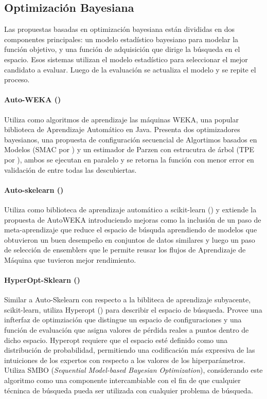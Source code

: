 \subsection{Optimizaci\'on Bayesiana}
Las propuestas basadas en optimizaci\'on bayesiana est\'an divididas en dos componentes principales: un modelo estad\'istico bayesiano para modelar la funci\'on objetivo, y una funci\'on de adquisici\'on que dirige la b\'usqueda en el espacio. Esos sistemas utilizan el modelo estad\'istico para seleccionar el mejor candidato a evaluar. Luego de la evaluaci\'on se actualiza el modelo y se repite el proceso.

\paragraph{Auto-WEKA (\cite{thornton2013auto})} Utiliza como algoritmos de aprendizaje las m\'aquinas WEKA, una popular biblioteca de Aprendizaje Autom\'atico en Java. Presenta dos optimizadores bayesianos, una propuesta de configuraci\'on secuencial de Algortimos basados en Modelos (SMAC por \cite{hutter2011sequential}) y un estimador de Parzen con estrucutra de \'arbol (TPE por \cite{bergstra2011algorithms}), ambos se ejecutan en paralelo y se retorna la funci\'on con menor error en validaci\'on de entre todas las descubiertas.

\paragraph*{Auto-skelearn (\cite{feurer2015efficient})} Utiliza como biblioteca de aprendizaje autom\'atico a scikit-learn (\cite{pedregosa2011scikit}) y extiende la propuesta de AutoWEKA  introduciendo mejoras como la inclusi\'on de un paso de meta-aprendizaje que reduce el espacio de b\'usquda aprendiendo de modelos que obtuvieron un buen desempe\~no en conjuntos de datos similares y luego un paso de selecci\'on de ensemblers que le permite reusar los flujos de Aprendizaje de M\'aquina que tuvieron mejor rendimiento. 

\paragraph*{HyperOpt-Sklearn (\cite{komer2014hyperopt})} Similar a Auto-Skelearn con respecto a la bibliteca de aprendizaje subyacente, scikit-learn, utiliza Hyperopt (\cite{bergstra2013hyperopt}) para describir el espacio de b\'usqueda. Provee una infterfaz de optimziaci\'on que distingue un espacio de configuraciones y una funci\'on de evaluaci\'on que asigna valores de p\'erdida reales a puntos dentro de dicho espacio. Hyperopt requiere que el espacio est\'e definido como una distribuci\'on de probabilidad, permitiendo una codificaci\'on m\'as expresiva de las intuiciones de los expertos con respecto a los valores de los hiperpar\'ametros. Utiliza SMBO (\textit{Sequential Model-based Bayesian Optimization}), considerando este algoritmo como una componente intercambiable con el fin de que cualquier t\'ecninca de b\'usqueda pueda ser utilizada con cualquier problema de b\'usqueda.

